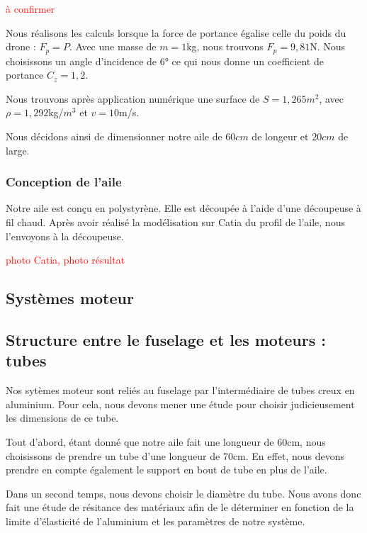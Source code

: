 \documentclass[a4paper,12pt,french]{report}
\begin{document}
\textcolor{red}{à confirmer}

Nous réalisons les calculs lorsque la force de portance égalise celle du poids du drone : $F_p=P.$ Avec une masse de $m=1$kg, nous trouvons $F_p=9,81$N. Nous choisissons un angle d'incidence de $6°$ ce qui nous donne un coefficient de portance $C_z=1,2$.\newline

Nous trouvons après application numérique une surface de $S=1,265$$m^2$, avec $\rho=1,292$kg/$m^3$ et $v=10$m/s.\newline

    Nous décidons ainsi de dimensionner notre aile de $60cm$ de longeur et $20cm$ de large.

\subsubsection*{Conception de l'aile}

Notre aile est conçu en polystyrène. Elle est découpée à l'aide d'une découpeuse à fil chaud. Après avoir réalisé la modélisation sur Catia du profil de l'aile, nous l'envoyons à la découpeuse.

\textcolor{red}{photo Catia, photo résultat}

\subsection{Systèmes moteur}

\subsection{Structure entre le fuselage et les moteurs : tubes}

Nos sytèmes moteur sont reliés au fuselage par l'intermédiaire de tubes creux en aluminium. Pour cela, nous devons mener une étude pour choisir judicieusement les dimensions de ce tube.\newline

Tout d'abord, étant donné que notre aile fait une longueur de 60cm, nous choisissons de prendre un tube d'une longueur de 70cm. En effet, nous devons prendre en compte également le support en bout de tube en plus de l'aile.\newline

Dans un second temps, nous devons choisir le diamètre du tube. Nous avons donc fait une étude de résitance des matériaux afin de le déterminer en fonction de la limite d'élasticité de l'aluminium et les paramètres de notre système.\newline
\end{document}
